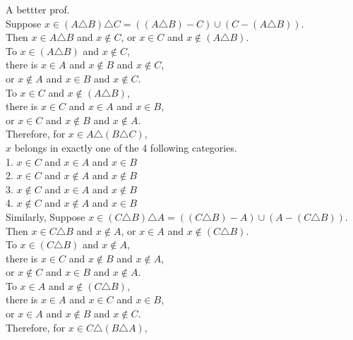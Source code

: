 \documentclass[a4paper,fleqn]{article}
\begin{document}
        A bettter prof.\\
            Suppose \(x\in (A\triangle B)\triangle C=((A\triangle B)-C )\cup (C-(A\triangle B))\).\\
            Then \(x\in A\triangle B\) and \(x\notin C\), 
            or \(x\in C\) and \(x\notin (A\triangle B)\).\\
            To \(x\in (A\triangle B)\) and \(x\notin C\),\\
            there is \(x\in A\) and \(x\notin B\) and \(x\notin C\), \\
            or \(x\notin A\) and \(x\in B\) and \(x\notin C\). \\
            To \(x\in C\) and \(x\notin (A\triangle B)\), \\
            there is \(x\in C\) and \(x\in A\) and \(x \in B\),\\
            or \(x\in C\) and \(x\notin B\) and \(x\notin A\).\\
            Therefore, for \(x\in A\triangle (B\triangle C)\), \\
            \(x\) belongs in exactly one of the 4 following categories. \\
            1. \(x\in C\) and \(x\in A\) and \(x\in B\)\\
            2. \(x\in C\) and \(x\notin A\) and \(x\notin B\)\\
            3. \(x\notin C\) and \(x \in A\) and \(x \notin B\)\\
            4. \(x\notin C\) and \(x\notin A\) and \(x\in B\)\\
            Similarly, Suppose \(x\in (C\triangle B)\triangle A=((C\triangle B)-A )\cup (A-(C\triangle B))\).\\
            Then \(x\in C\triangle B\) and \(x\notin A\), 
            or \(x\in A\) and \(x\notin (C\triangle B)\).\\
            To \(x\in (C\triangle B)\) and \(x\notin A\),\\
            there is \(x\in C\) and \(x\notin B\) and \(x\notin A\), \\
            or \(x\notin C\) and \(x\in B\) and \(x\notin A\). \\
            To \(x\in A\) and \(x\notin (C\triangle B)\), \\
            there is \(x\in A\) and \(x\in C\) and \(x \in B\),\\
            or \(x\in A\) and \(x\notin B\) and \(x\notin C\).\\
            Therefore, for \(x\in C\triangle (B\triangle A)\), \\
\end{document}
